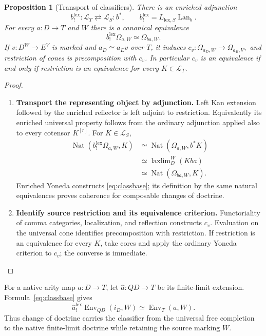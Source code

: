 \documentclass[oneside]{article}
\theoremstyle{plain}
\newtheorem{proposition}[theorem]{Proposition}
\theoremstyle{definition}
\theoremstyle{remark}
\newcommand{\Env}{\operatorname{Env}}
\newcommand{\LT}{\mathcal L_T}
\newcommand{\Nat}{\operatorname{Nat}}
\newcommand{\laxlim}{\mathop{\mathrm{laxlim}}}
\begin{document}
\begin{proposition}[Transport of classifiers]\label{prop:classifierchange}
There is an enriched adjunction
\[
 b_!^{\mathrm{lex}}:\LT\rightleftarrows\mathcal L_S:b^*,
 \qquad b_!^{\mathrm{lex}}=L_{\mathrm{lex},S}\operatorname{Lan}_b.
\]
For every $a:D\to T$ and $W$ there is a canonical equivalence
\begin{equation}\label{eq:classbase}
 b_!^{\mathrm{lex}}\Omega_{a,W}\simeq\Omega_{ba,W}.
\end{equation}
If $v:D^W\to E^V$ is marked and $a_D\simeq a_Ev$ over $T$, it induces $c_v:\Omega_{a_D,W}\longrightarrow\Omega_{a_E,V},$ and restriction of cones is precomposition with $c_v$. In particular $c_v$ is an equivalence if and only if restriction is an equivalence for every $K\in\LT$.
\end{proposition}
\begin{proof}
\leavevmode
\begin{enumerate}
\item \textbf{Transport the representing object by adjunction.} Left Kan extension followed by the enriched reflector is left adjoint to restriction. Equivalently its enriched universal property follows from the ordinary adjunction applied also to every cotensor $K^{[r]}$. For $K\in\mathcal L_S$,
\begin{align*}
 \Nat(b_!^{\mathrm{lex}}\Omega_{a,W},K)
 &\simeq\Nat(\Omega_{a,W},b^*K)\\
 &\simeq\laxlim\nolimits_D^W(Kba)\\
 &\simeq\Nat(\Omega_{ba,W},K).
\end{align*}
Enriched Yoneda constructs \eqref{eq:classbase}; its definition by the same natural equivalences proves coherence for composable changes of doctrine.
\item \textbf{Identify source restriction and its equivalence criterion.} Functoriality of comma categories, localization, and reflection constructs $c_v$. Evaluation on the universal cone identifies precomposition with restriction. If restriction is an equivalence for every $K$, take cores and apply the ordinary Yoneda criterion to $c_v$; the converse is immediate.\qedhere
\end{enumerate}
\end{proof}

For a native arity map $a:D\to T$, let $\widehat a:QD\to T$ be its
finite-limit extension. Formula~\eqref{eq:classbase} gives
\[
 \widehat a_!^{\mathrm{lex}}\Env_{QD}(i_D,W)
 \simeq\Env_T(a,W).
\]
Thus change of doctrine carries the classifier from the universal
free completion to the native finite-limit doctrine while retaining
the source marking $W$.
\end{document}
